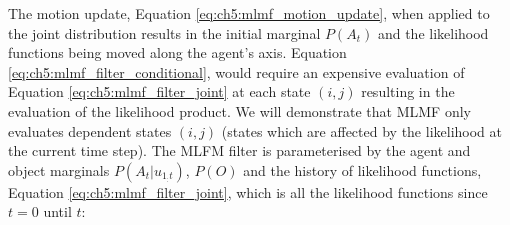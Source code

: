  
\begin{center}
%
\end{center}

 
The motion update, Equation \ref{eq:ch5:mlmf_motion_update}, when applied to the joint distribution results in the 
initial marginal $P(A_t)$ and the likelihood functions being moved along the agent's axis. Equation \ref{eq:ch5:mlmf_filter_conditional}, would 
require an expensive evaluation of Equation \ref{eq:ch5:mlmf_filter_joint} 
at each state $(i,j)$ resulting in the evaluation of the likelihood product. We will demonstrate that MLMF only evaluates dependent states $(i,j)$ (states which are affected by the likelihood at the current time step).
The MLFM filter is parameterised by the agent and object marginals $P(A_t|u_{1_:t})$, $P(O)$ and the history of likelihood functions,
Equation \ref{eq:ch5:mlmf_filter_joint}, which is all the likelihood functions since $t=0$ until $t$: 

